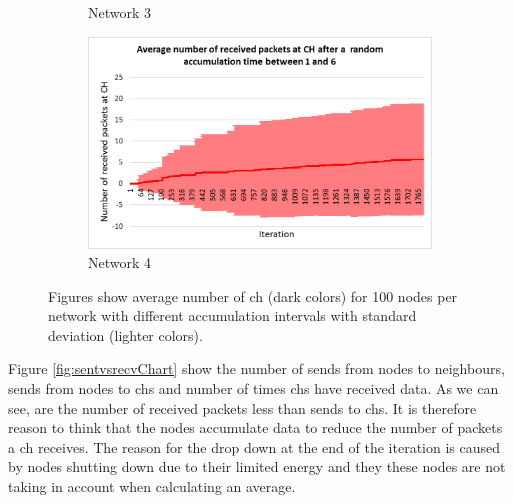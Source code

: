 \documentclass[USenglish]{uit-thesis}
\begin{document}
\begin{figure}  [ht]
\begin{subfigure}[b]{0.475\textwidth}
            \caption[]%
            {{\small Network 3}}    
            \label{fig:recvfig3}
        \end{subfigure}
        \quad
        \begin{subfigure}[b]{0.475\textwidth}   
            \centering 
            \includegraphics[width=\textwidth]{RecvPkt_stdev_rand.png}
            \caption[]%
            {{\small Network 4}}    
            \label{fig:recvfig4}
        \end{subfigure}
        \caption[Figures show average number of \gls{ch} for 100 nodes per network with different accumulation intervals with standard deviation.]
        {\small Figures show average number of \gls{ch} (dark colors) for 100 nodes per network with different accumulation intervals with standard deviation (lighter colors).} 
        \label{fig:recPktChart}
    \end{figure}




Figure \ref{fig:sentvsrecvChart} show the number of sends from nodes to neighbours, sends from nodes to \glspl{ch} and number of times \glspl{ch} have received data. As we can see, are the number of received packets less than sends to \glspl{ch}. It is therefore reason to think that the nodes accumulate data to reduce the number of packets a \gls{ch} receives. The reason for the drop down at the end of the iteration is caused by nodes shutting down due to their limited energy and they these nodes are not taking in account when calculating an average.


\end{document}
